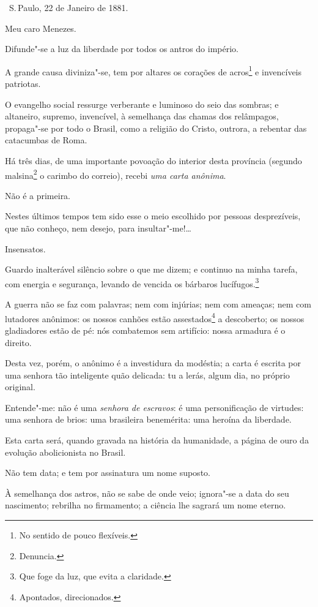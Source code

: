 \hfill\ S.\,Paulo, 22 de Janeiro de 1881.\bigskip

\noindent{}Meu caro Menezes.\smallskip

Difunde"-se a luz da liberdade por todos os antros do império.

A grande causa diviniza"-se, tem por altares os corações de
acros\footnote{No sentido de pouco flexíveis.} e invencíveis
patriotas.

O evangelho social ressurge verberante e luminoso do seio das sombras; e
altaneiro, supremo, invencível, à semelhança das chamas dos relâmpagos,
propaga"-se por todo o Brasil, como a religião do Cristo, outrora, a
rebentar das catacumbas de Roma.

Há três dias, de uma importante povoação do interior desta província
(segundo malsina\footnote{Denuncia.} o carimbo do correio), recebi
\emph{uma carta anônima}.

Não é a primeira.

Nestes últimos tempos tem sido esse o meio escolhido por pessoas
desprezíveis, que não conheço, nem desejo, para insultar"-me!\ldots{}

Insensatos.

Guardo inalterável silêncio sobre o que me dizem; e continuo na minha
tarefa, com energia e segurança, levando de vencida os bárbaros
lucífugos.\footnote{Que foge da luz, que evita a claridade.}

A guerra não se faz com palavras; nem com injúrias; nem com ameaças; nem
com lutadores anônimos: os nossos canhões estão assestados\footnote{
  Apontados, direcionados.} a descoberto; os nossos gladiadores estão de
pé: nós combatemos sem artifício: nossa armadura é o direito.

Desta vez, porém, o anônimo é a investidura da modéstia; a carta é
escrita por uma senhora tão inteligente quão delicada: tu a lerás, algum
dia, no próprio original.

Entende"-me: não é uma \emph{senhora de escravos}: é uma personificação
de virtudes: uma senhora de brios: uma brasileira benemérita: uma
heroína da liberdade.

Esta carta será, quando gravada na história da humanidade, a página de
ouro da evolução abolicionista no Brasil.

Não tem data; e tem por assinatura um nome suposto.

À semelhança dos astros, não se sabe de onde veio; ignora"-se a data do
seu nascimento; rebrilha no firmamento; a ciência lhe sagrará um nome
eterno.

